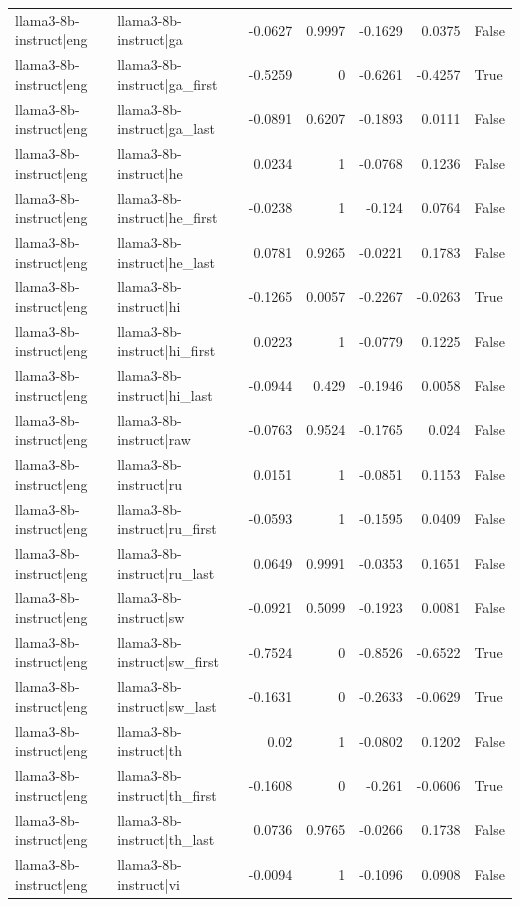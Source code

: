 \begin{table}
\begin{tabular}{l l r r r r l}
llama3-8b-instruct|eng & llama3-8b-instruct|ga & -0.0627 & 0.9997 & -0.1629 & 0.0375 & False \\
llama3-8b-instruct|eng & llama3-8b-instruct|ga_first & -0.5259 & 0 & -0.6261 & -0.4257 & True \\
llama3-8b-instruct|eng & llama3-8b-instruct|ga_last & -0.0891 & 0.6207 & -0.1893 & 0.0111 & False \\
llama3-8b-instruct|eng & llama3-8b-instruct|he & 0.0234 & 1 & -0.0768 & 0.1236 & False \\
llama3-8b-instruct|eng & llama3-8b-instruct|he_first & -0.0238 & 1 & -0.124 & 0.0764 & False \\
llama3-8b-instruct|eng & llama3-8b-instruct|he_last & 0.0781 & 0.9265 & -0.0221 & 0.1783 & False \\
llama3-8b-instruct|eng & llama3-8b-instruct|hi & -0.1265 & 0.0057 & -0.2267 & -0.0263 & True \\
llama3-8b-instruct|eng & llama3-8b-instruct|hi_first & 0.0223 & 1 & -0.0779 & 0.1225 & False \\
llama3-8b-instruct|eng & llama3-8b-instruct|hi_last & -0.0944 & 0.429 & -0.1946 & 0.0058 & False \\
llama3-8b-instruct|eng & llama3-8b-instruct|raw & -0.0763 & 0.9524 & -0.1765 & 0.024 & False \\
llama3-8b-instruct|eng & llama3-8b-instruct|ru & 0.0151 & 1 & -0.0851 & 0.1153 & False \\
llama3-8b-instruct|eng & llama3-8b-instruct|ru_first & -0.0593 & 1 & -0.1595 & 0.0409 & False \\
llama3-8b-instruct|eng & llama3-8b-instruct|ru_last & 0.0649 & 0.9991 & -0.0353 & 0.1651 & False \\
llama3-8b-instruct|eng & llama3-8b-instruct|sw & -0.0921 & 0.5099 & -0.1923 & 0.0081 & False \\
llama3-8b-instruct|eng & llama3-8b-instruct|sw_first & -0.7524 & 0 & -0.8526 & -0.6522 & True \\
llama3-8b-instruct|eng & llama3-8b-instruct|sw_last & -0.1631 & 0 & -0.2633 & -0.0629 & True \\
llama3-8b-instruct|eng & llama3-8b-instruct|th & 0.02 & 1 & -0.0802 & 0.1202 & False \\
llama3-8b-instruct|eng & llama3-8b-instruct|th_first & -0.1608 & 0 & -0.261 & -0.0606 & True \\
llama3-8b-instruct|eng & llama3-8b-instruct|th_last & 0.0736 & 0.9765 & -0.0266 & 0.1738 & False \\
llama3-8b-instruct|eng & llama3-8b-instruct|vi & -0.0094 & 1 & -0.1096 & 0.0908 & False \\

\end{tabular}
\end{table}
